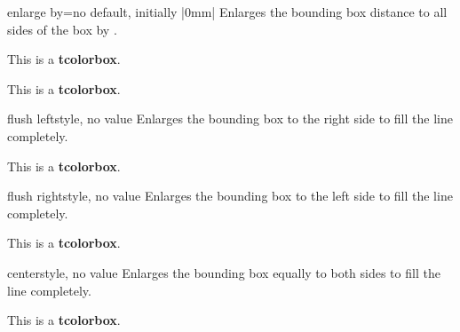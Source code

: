 \clearpage
\begin{docTcbKey}{enlarge by}{=}{no default, initially |0mm|}
  Enlarges the bounding box distance to all sides of the box by .
\begin{dispExample}

\begin{tcolorbox}
This is a \textbf{tcolorbox}.
\end{tcolorbox}
\begin{tcolorbox}[enlarge by=5mm,enhanced,show bounding box]
This is a \textbf{tcolorbox}.
\end{tcolorbox}
\end{dispExample}
\end{docTcbKey}



\begin{docTcbKey}[][doc new=2015-11-20]{flush left}{}{style, no value}
  Enlarges the bounding box to the right side to fill the line completely.
\begin{dispExample}

\begin{tcolorbox}[flush left,width=5cm,enhanced,show bounding box]
This is a \textbf{tcolorbox}.
\end{tcolorbox}
\end{dispExample}
\end{docTcbKey}


\begin{docTcbKey}[][doc new=2015-11-20]{flush right}{}{style, no value}
  Enlarges the bounding box to the left side to fill the line completely.
\begin{dispExample}

\begin{tcolorbox}[flush right,width=5cm,enhanced,show bounding box]
This is a \textbf{tcolorbox}.
\end{tcolorbox}
\end{dispExample}
\end{docTcbKey}


\begin{docTcbKey}[][doc new=2015-11-20]{center}{}{style, no value}
  Enlarges the bounding box equally to both sides to fill the line completely.
\begin{dispExample}

\begin{tcolorbox}[center,width=5cm,enhanced,show bounding box]
This is a \textbf{tcolorbox}.
\end{tcolorbox}
\end{dispExample}
\end{docTcbKey}

